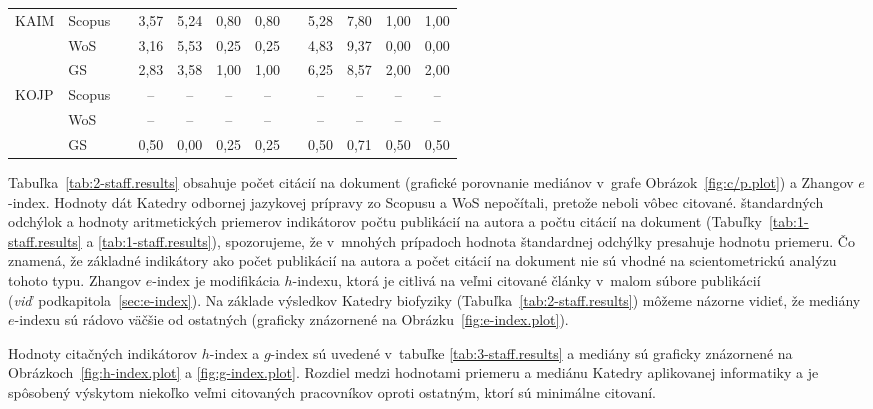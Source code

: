 \begin{table}
\begin{tabularx}{\textwidth}{XXp{1ex}ccccp{1ex}cccc}
    KAIM & Scopus & & 3,57  & 5,24  & 0,80  & 0,80  & & 5,28  & 7,80  & 1,00  & 1,00  \\
         & WoS    & & 3,16  & 5,53  & 0,25  & 0,25  & & 4,83  & 9,37  & 0,00  & 0,00  \\
         & GS     & & 2,83  & 3,58  & 1,00  & 1,00  & & 6,25  & 8,57  & 2,00  & 2,00  \\[1ex]
    KOJP & Scopus & & --    & --    & --    & --    & & --    & --    & --    & --    \\
         & WoS    & & --    & --    & --    & --    & & --    & --    & --    & --    \\
         & GS     & & 0,50  & 0,00  & 0,25  & 0,25  & & 0,50  & 0,71  & 0,50  & 0,50  \\
    \bottomrule
  \end{tabularx}
\end{table}

Tabuľka~\ref{tab:2-staff.results} obsahuje počet citácií na dokument (grafické
porovnanie mediánov v~grafe Obrázok~\ref{fig:c/p.plot}) a Zhangov $e$-index.
Hodnoty dát Katedry odbornej jazykovej prípravy zo Scopusu a WoS nepočítali,
pretože neboli vôbec citované.  štandardných odchýlok a hodnoty aritmetických
priemerov indikátorov počtu publikácií na autora a počtu citácií na dokument
(Tabuľky~\ref{tab:1-staff.results} a \ref{tab:1-staff.results}), spozorujeme, že
v~mnohých prípadoch hodnota štandardnej odchýlky presahuje hodnotu priemeru.  Čo
znamená, že základné indikátory ako počet publikácií na autora a počet citácií
na dokument nie sú vhodné na scientometrickú analýzu tohoto typu.  Zhangov
$e$-index je modifikácia $h$-indexu, ktorá je citlivá na veľmi citované články
v~malom súbore publikácií (\emph{viď}~podkapitola~\ref{sec:e-index}).  Na
základe výsledkov Katedry biofyziky (Tabuľka~\ref{tab:2-staff.results}) môžeme
názorne vidieť, že mediány $e$-indexu sú rádovo väčšie od ostatných (graficky
znázornené na Obrázku~\ref{fig:e-index.plot}).

Hodnoty citačných indikátorov $h$-index a $g$-index sú uvedené v~tabuľke
\ref{tab:3-staff.results} a mediány sú graficky znázornené na
Obrázkoch~\ref{fig:h-index.plot} a \ref{fig:g-index.plot}.  Rozdiel medzi
hodnotami priemeru a mediánu Katedry aplikovanej informatiky a je spôsobený
výskytom niekoľko veľmi citovaných pracovníkov oproti ostatným, ktorí sú
minimálne citovaní.

